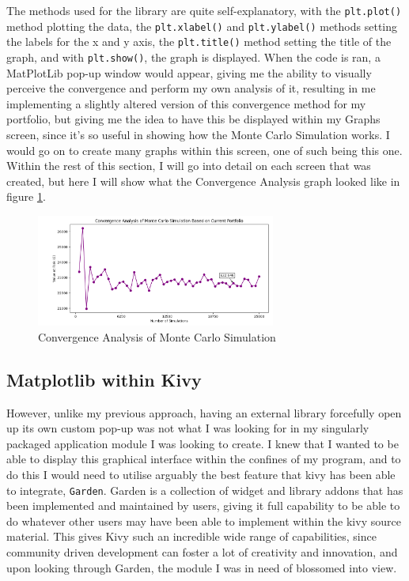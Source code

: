 \documentclass{article}
\begin{document}
\vspace{0.3cm}
The methods used for the library are quite self-explanatory, with the \texttt{plt.plot()} method plotting the data, the \texttt{plt.xlabel()} and \texttt{plt.ylabel()} methods setting the labels for the x and y axis, the \texttt{plt.title()} method setting the title of the graph, and with \texttt{plt.show()}, the graph is displayed. When the code is ran, a MatPlotLib pop-up window would appear, giving me the ability to visually perceive the convergence and perform my own analysis of it, resulting in me implementing a slightly altered version of this convergence method for my portfolio, but giving me the idea to have this be displayed within my Graphs screen, since it's so useful in showing how the Monte Carlo Simulation works. I would go on to create many graphs within this screen, one of such being this one. Within the rest of this section, I will go into detail on each screen that was created, but here I will show what the Convergence Analysis graph looked like in figure \ref{fig:Convergence Analysis}.\\\vspace{0.3cm}

\begin{figure}[h]
  \centering
  \includegraphics[width=0.7\textwidth]{Images/Term 2 Images/Image (1).png}
  \caption{Convergence Analysis of Monte Carlo Simulation}
  \label{fig:Convergence Analysis}
\end{figure}

\subsection{Matplotlib within Kivy}
However, unlike my previous approach, having an external library forcefully open up its own custom pop-up was not what I was looking for in my singularly packaged application module I was looking to create. I knew that I wanted to be able to display this graphical interface within the confines of my program, and to do this I would need to utilise arguably the best feature that kivy has been able to integrate, \texttt{Garden}. Garden is a collection of widget and library addons that has been implemented and maintained by users, giving it full capability to be able to do whatever other users may have been able to implement within the kivy source material. This gives Kivy such an incredible wide range of capabilities, since community driven development can foster a lot of creativity and innovation, and upon looking through Garden, the module I was in need of blossomed into view.\\\vspace{0.3cm}
\end{document}
